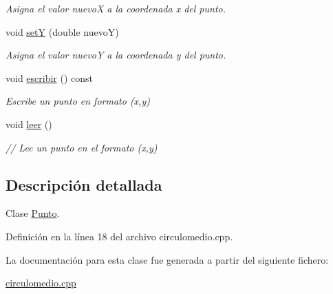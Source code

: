 \begin{DoxyCompactItemize}
\begin{DoxyCompactList}\small\item\em Asigna el valor nuevo\-X a la coordenada x del punto. \end{DoxyCompactList}\item 
\hypertarget{classPunto_a6a0f8adb5946f31a7867a06f54d97462}{void \hyperlink{classPunto_a6a0f8adb5946f31a7867a06f54d97462}{set\-Y} (double nuevo\-Y)}\label{classPunto_a6a0f8adb5946f31a7867a06f54d97462}

\begin{DoxyCompactList}\small\item\em Asigna el valor nuevo\-Y a la coordenada y del punto. \end{DoxyCompactList}\item 
\hypertarget{classPunto_afc543b48134f632fa354d8b027954e80}{void \hyperlink{classPunto_afc543b48134f632fa354d8b027954e80}{escribir} () const }\label{classPunto_afc543b48134f632fa354d8b027954e80}

\begin{DoxyCompactList}\small\item\em Escribe un punto en formato (x,y) \end{DoxyCompactList}\item 
\hypertarget{classPunto_a84cc9b0ee2e5b00842e7bff819b80459}{void \hyperlink{classPunto_a84cc9b0ee2e5b00842e7bff819b80459}{leer} ()}\label{classPunto_a84cc9b0ee2e5b00842e7bff819b80459}

\begin{DoxyCompactList}\small\item\em // Lee un punto en el formato (x,y) \end{DoxyCompactList}\end{DoxyCompactItemize}


\subsection{Descripción detallada}
Clase \hyperlink{classPunto}{Punto}. 

Definición en la línea 18 del archivo circulomedio.\-cpp.



La documentación para esta clase fue generada a partir del siguiente fichero\-:\begin{DoxyCompactItemize}
\item 
\hyperlink{circulomedio_8cpp}{circulomedio.\-cpp}\end{DoxyCompactItemize}
